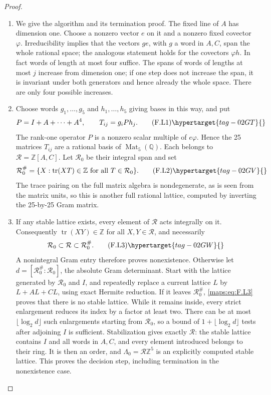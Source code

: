 \begin{proof}
\begin{enumerate}[label={$\langle1\rangle$\arabic*.}]
\item We give the algorithm and its termination proof.
The fixed line of $A$ has dimension one.  Choose a nonzero
vector $e$ on it and a nonzero fixed covector $\varphi$.
Irreducibility implies that the vectors $ge$, with $g$ a
word in $A,C$, span the whole rational space; the analogous
statement holds for the covectors $\varphi h$.
In fact words of length at most four suffice.  The spans of
words of lengths at most $j$ increase from dimension one;
if one step does not increase the span, it is invariant
under both generators and hence already the whole space.
There are only four possible increases.

\item Choose words $g_1,\ldots,g_5$ and $h_1,\ldots,h_5$ giving
bases in this way, and put
\[
 P=I+A+\cdots+A^4,\qquad T_{ij}=g_iPh_j.
 \tag{F.L1}\hypertarget{tag-02GT}{}\label{maps:eq:F.L1}
\]
The rank-one operator $P$ is a nonzero scalar multiple of
$e\varphi$.  Hence the 25 matrices $T_{ij}$ are a rational
basis of $\operatorname{Mat}_5(\mathbb Q)$.
Each belongs to $\mathcal R=\mathbb Z[A,C]$.
Let $\mathcal R_0$ be their integral span and set
\[
 \mathcal R_0^\#=
 \{X:\operatorname{tr}(XT)\in\mathbb Z
                     \text{ for all }T\in\mathcal R_0\}.
 \tag{F.L2}\hypertarget{tag-02GV}{}\label{maps:eq:F.L2}
\]
The trace pairing on the full matrix algebra is
nondegenerate, as is seen from the matrix units, so this
is another full rational lattice, computed by inverting
the 25-by-25 Gram matrix.

\item If any stable lattice exists, every element of $\mathcal R$
acts integrally on it.  Consequently
$\operatorname{tr}(XY)\in\mathbb Z$ for all
$X,Y\in\mathcal R$, and necessarily
\[
 \mathcal R_0\subset\mathcal R\subset\mathcal R_0^\#.
 \tag{F.L3}\hypertarget{tag-02GW}{}\label{maps:eq:F.L3}
\]
A nonintegral Gram entry therefore proves nonexistence.
Otherwise let
$d=[\mathcal R_0^\#:\mathcal R_0]$, the absolute Gram
determinant.  Start with the lattice generated by
$\mathcal R_0$ and $I$, and repeatedly replace a current
lattice $L$ by $L+AL+CL$, using exact Hermite reduction.
If it leaves $\mathcal R_0^\#$, \eqref{maps:eq:F.L3} proves that there
is no stable lattice.
While it remains inside, every strict enlargement reduces
its index by a factor at least two.
There can be at most $\lfloor\log_2d\rfloor$ such
enlargements starting from $\mathcal R_0$, so a bound of
$1+\lfloor\log_2d\rfloor$ tests after adjoining $I$ is
sufficient.  Stabilization gives exactly $\mathcal R$:
the stable lattice contains $I$ and all words in $A,C$,
and every element introduced belongs to their ring.
It is then an order, and
$\Lambda_0=\mathcal R\mathbb Z^5$ is an explicitly
computed stable lattice.  This proves the decision step,
including termination in the nonexistence case.


\end{enumerate}
\end{proof}
